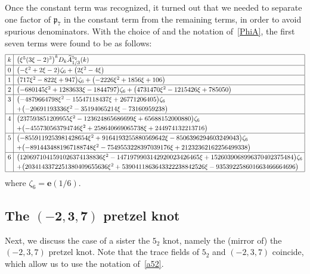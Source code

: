 \documentclass[pdftex]{sigma}
\numberwithin{equation}{section}
\def\wt{\widetilde}
\def\z{\zeta}
\def\e{\mathbf{e}}
\def\p{\mathfrak p}
\def\e{\mathbf{e}}
\def\z{\zeta}
\def\tiA{\wt A}
\begin{document}
Once the constant term was recognized, it turned out that we needed to
separate one factor of $\p_7$ in the constant term 
from the remaining terms, in order to avoid spurious denominators.
With the choice of \smash{$C_{1/3}=\e(1/36) (3\xi-2)^{-\frac{1}{2}} \p_7  \p_{43}$}
and the notation of~\eqref{PhiA}, the first seven terms were found to be
as follows:
{\small
$$
\def\arraystretch{1.2}
\begin{array}{|@{\,\,}c@{\,\,}|l|l|} \hline
k & \big(\xi^5 (3\xi-2)^3\big)^k  D_k  \tiA^{5_2}_{1/3}(k) \\ \hline
0 & \bigl(-\xi^2 + 2 \xi - 2\bigr) \z_6 + \big(2 \xi^2 - 4 \xi\big)
\\ \hline
1 & \big(717 \xi^2 - 822 \xi + 947\big) \z_6 + \bigl(-2226 \xi^2 + 1856 \xi + 106\bigr)
\\ \hline
2 & \bigl(-680145 \xi^2 + 1283633 \xi - 1844797\bigr) \z_6 + \big(4731470 \xi^2 - 1215426 \xi + 785050\big)
\\ \hline
3 & \bigl(-4879664798 \xi^2 - 15547118437 \xi + 26771206405\bigr) \z_6
\\ &
+ \bigl(-20691193336 \xi^2 - 35194065214 \xi - 73160959238\bigr)
\\ \hline
4 & \big(237593851209955 \xi^2 - 123624865686699 \xi + 65688152000880\big) \z_6
\\ &
+ \bigl(-455730563794746 \xi^2 + 258640669065738 \xi + 244974132213716\bigr)
\\ \hline
5 & \bigl(-8559119253981428654 \xi^2 + 9164193255880569642 \xi - 8506396294603249043\bigr) \z_6
\\ &
+ \bigl(-8914434881967188748 \xi^2 - 7549553228397039176 \xi + 21232362162256499338\bigr)
\\ \hline
6 & \big(1206971041591026374138836 \xi^2 - 1471979903142920023426465 \xi + 1526039068996370402375484\big) \z_6\!
\\ &
+ \big(2034143372251380409655636 \xi^2 + 5390411863643322238842526 \xi - 935392258601663466664696\big)
\\ \hline
\end{array}
$$}%
where $\z_6=\e(1/6)$.

\subsection[The (-2,3,7) pretzel knot]{The $\boldsymbol{(-2,3,7)}$ pretzel knot}
\label{sub.237}

Next, we discuss the case of a sister the $5_2$ knot, namely the
(mirror of) the $(-2,3,7)$ pretzel knot.
Note that the trace fields of $5_2$ and $(-2,3,7)$ coincide,
which allow us to use the notation of~\eqref{a52}.
\end{document}
